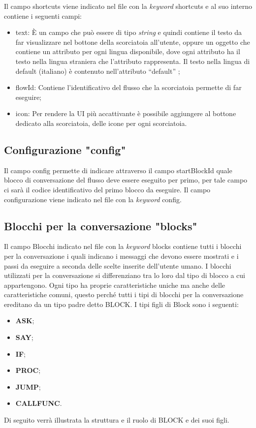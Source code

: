Il campo shortcuts viene indicato nel file con la \emph{keyword} shortcuts
e al suo interno contiene i seguenti campi:
\begin{itemize}
	\item text: È un campo che può essere di tipo \emph{string} e quindi contiene il testo da far visualizzare nel bottone della scorciatoia all'utente, oppure un oggetto che contiene un attributo per ogni lingua disponibile, dove ogni attributo ha il testo nella lingua straniera che l'attributo rappresenta. Il testo nella lingua di default (italiano) è contenuto nell’attributo “default” ;
	\item flowId: Contiene l'identificativo del flusso che la scorciatoia permette di far eseguire;
	\item icon: Per rendere la UI più accattivante è possibile aggiungere al bottone dedicato alla scorciatoia, delle icone per ogni scorciatoia.
\end{itemize}
\clearpage
\subsection{Configurazione "config"}
Il campo config permette di indicare attraverso il campo startBlockId quale blocco di conversazione del flusso deve essere eseguito per primo, per tale campo ci sarà il codice identificativo del primo blocco da eseguire. Il campo configurazione viene indicato nel file con la \emph{keyword} config.

\subsection{Blocchi per la conversazione "blocks"}
Il campo Blocchi indicato nel file con la \emph{keyword} blocks contiene tutti i blocchi per la conversazione i quali indicano i messaggi che devono essere mostrati e i passi da eseguire a seconda delle scelte inserite dell'utente umano.
I blocchi utilizzati per la conversazione si differenziano tra lo loro dal tipo di blocco a cui appartengono. Ogni tipo ha proprie caratteristiche uniche ma anche delle caratteristiche comuni, questo perché tutti i tipi di blocchi per la conversazione ereditano da un tipo padre detto BLOCK. I tipi figli di Block sono i seguenti:
\begin{itemize}
	\item\textbf{ASK};
	\item\textbf{SAY};
	\item\textbf{IF};
	\item\textbf{PROC};
	\item\textbf{JUMP};
	\item\textbf{CALLFUNC}.
\end{itemize}
Di seguito verrà illustrata la struttura e il ruolo di BLOCK e dei suoi figli.
